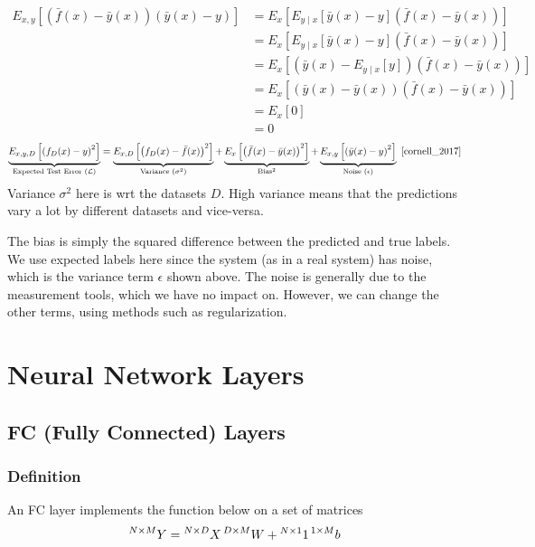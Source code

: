\documentclass{book}
\numberwithin{equation}{subsection}
\begin{document}
\begin{align}
	E_{x, y} \left[\left(\bar{f}(x) - \bar{y}(x)\right)\left(\bar{y}(x) - y\right)\right] &= E_{x}\left[E_{y \mid x} \left[\bar{y}(x) - y \right] \left(\bar{f}(x) - \bar{y}(x) \right) \right] \\
    &= E_{x} \left[ E_{y \mid x} \left[ \bar{y}(x) - y\right] \left(\bar{f}(x) - \bar{y}(x)\right)\right] \\
    &= E_{x} \left[ \left( \bar{y}(x) - E_{y \mid x} \left [ y \right]\right) \left(\bar{f}(x) - \bar{y}(x)\right)\right] \\
    &= E_{x} \left[ \left( \bar{y}(x) - \bar{y}(x) \right) \left(\bar{f}(x) - \bar{y}(x)\right)\right] \\
    &= E_{x} \left[ 0 \right] \\
    &= 0
\end{align}
\begin{equation}
	\underbrace{E_{x, y, D} \left[\left(f_D(x) - y\right)^{2}\right]}_{\text{Expected Test Error }(\mathcal{L})} = \underbrace{E_{x, D}\left[\left(f_D(x) - \bar{f}(x)\right)^{2}\right]}_{\text{Variance }(\sigma^2)} + \underbrace{E_{x}\left[\left(\bar{f}(x) - \bar{y}(x)\right)^{2}\right]}_\mathrm{Bias^2} + \underbrace{E_{x, y}\left[\left(\bar{y}(x) - y\right)^{2}\right]}_{\text{Noise }(\epsilon)}~\cite{cornell_2017}
\end{equation}
Variance $\sigma^2$ here is wrt the datasets $D$. High variance means that the predictions vary a lot by different datasets and vice-versa.

The bias is simply the squared difference between the predicted and true labels. We use expected labels here since the system (as in a real system) has noise, which is the variance term $\epsilon$ shown above. The noise is generally due to the measurement tools, which we have no impact on. However, we can change the other terms, using methods such as regularization.
\chapter{Neural Network Layers}
\section{FC (Fully Connected) Layers}
\subsection{Definition}
An FC layer implements the function below on a set of matrices
\begin{equation}
    \prescript{N\times M}{}{Y} = \prescript{N\times D}{}{X}\prescript{D\times M}{}{W} + \prescript{N\times1}{}{1}\prescript{1\times M}{}{b}
\end{equation}
\end{document}
